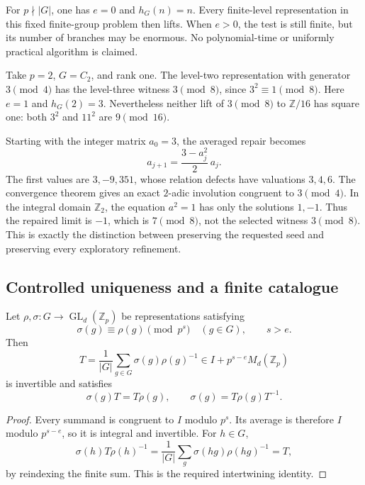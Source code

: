 For $p\nmid|G|$, one has $e=0$ and $h_G(n)=n$. Every finite-level representation in this fixed finite-group problem then lifts. When $e>0$, the test is still finite, but its number of branches may be enormous. No polynomial-time or uniformly practical algorithm is claimed.

\begin{example}\label{ex:horizon-witness}
Take $p=2$, $G=C_2$, and rank one. The level-two representation with generator $3\pmod4$ has the level-three witness $3\pmod8$, since $3^2\equiv1\pmod8$. Here $e=1$ and $h_G(2)=3$. Nevertheless neither lift of $3\pmod8$ to $\mathbb Z/16$ has square one: both $3^2$ and $11^2$ are $9\pmod{16}$.

Starting with the integer matrix $a_0=3$, the averaged repair becomes
\[
 a_{j+1}=\frac{3-a_j^2}{2}\,a_j.
\]
The first values are $3,-9,351$, whose relation defects have valuations $3,4,6$. The convergence theorem gives an exact $2$-adic involution congruent to $3\pmod4$. In the integral domain $\mathbb Z_2$, the equation $a^2=1$ has only the solutions $1,-1$. Thus the repaired limit is $-1$, which is $7\pmod8$, not the selected witness $3\pmod8$. This is exactly the distinction between preserving the requested seed and preserving every exploratory refinement.
\end{example}

\subsection{Controlled uniqueness and a finite catalogue}

\begin{theorem}\label{thm:close-action-conjugacy}
Let $\rho,\sigma:G\to\operatorname{GL}_d(\mathbb Z_p)$ be representations satisfying
\[
 \sigma(g)\equiv\rho(g)\pmod{p^s}\quad(g\in G),\qquad s>e.
\]
Then
\[
 T=\frac1{|G|}\sum_{g\in G}\sigma(g)\rho(g)^{-1}
 \in I+p^{s-e}M_d(\mathbb Z_p)
\]
is invertible and satisfies
\[
 \sigma(g)T=T\rho(g),\qquad
 \sigma(g)=T\rho(g)T^{-1}.
\]
\end{theorem}
\begin{proof}
Every summand is congruent to $I$ modulo $p^s$. Its average is therefore $I$ modulo $p^{s-e}$, so it is integral and invertible. For $h\in G$,
\[
 \sigma(h)T\rho(h)^{-1}
 =\frac1{|G|}\sum_g\sigma(hg)\rho(hg)^{-1}=T,
\]
by reindexing the finite sum. This is the required intertwining identity.
\end{proof}

